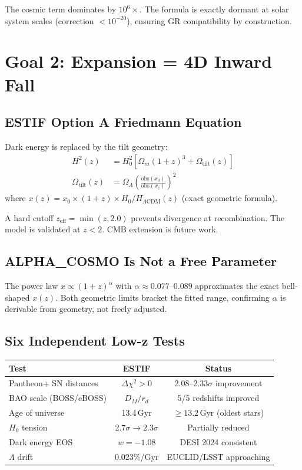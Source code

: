 \documentclass[12pt]{article}
\begin{document}
The cosmic term dominates by $10^6\times$. The formula is exactly dormant at solar system
scales (correction $< 10^{-20}$), ensuring GR compatibility by construction.

\section{Goal 2: Expansion = 4D Inward Fall}

\subsection{ESTIF Option A Friedmann Equation}

Dark energy is replaced by the tilt geometry:
\begin{align}
H^2(z) &= H_0^2 \left[\Omega_m(1+z)^3 + \Omega_\text{tilt}(z)\right] \\
\Omega_\text{tilt}(z) &= \Omega_\Lambda \left(\frac{\text{obs}(x_0)}{\text{obs}(x_z)}\right)^2
\end{align}
where $x(z) = x_0 \times (1+z) \times H_0/H_{\Lambda\text{CDM}}(z)$ (exact geometric formula).

A hard cutoff $z_\text{eff} = \min(z, 2.0)$ prevents divergence at recombination.
The model is validated at $z < 2$. CMB extension is future work.

\subsection{ALPHA\_COSMO Is Not a Free Parameter}

The power law $x \propto (1+z)^\alpha$ with $\alpha \approx 0.077$--$0.089$ approximates
the exact bell-shaped $x(z)$. Both geometric limits bracket the fitted range, confirming
$\alpha$ is derivable from geometry, not freely adjusted.

\subsection{Six Independent Low-z Tests}

\begin{center}
\begin{tabular}{lcc}
\toprule
Test & ESTIF & Status \\
\midrule
Pantheon+ SN distances & $\Delta\chi^2 > 0$ & 2.08--2.33$\sigma$ improvement \\
BAO scale (BOSS/eBOSS) & $D_M/r_d$ & 5/5 redshifts improved \\
Age of universe & 13.4\,Gyr & $\geq 13.2$\,Gyr (oldest stars) \\
$H_0$ tension & 2.7$\sigma \to 2.3\sigma$ & Partially reduced \\
Dark energy EOS & $w = -1.08$ & DESI 2024 consistent \\
$\Lambda$ drift & $0.023\%$/Gyr & EUCLID/LSST approaching \\
\bottomrule
\end{tabular}
\end{center}
\end{document}
